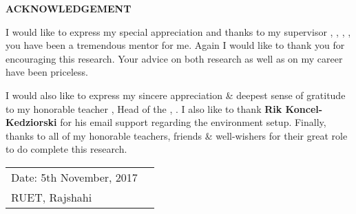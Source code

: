 \documentclass[document.tex]{subfiles}
\begin{document}

\begin{center}
\textbf{{\fontsize{16pt}{0.5cm}\selectfont ACKNOWLEDGEMENT}}
\vspace{1cm}
\end{center}

\noindent I would like to express my special appreciation and thanks to my supervisor \textbf{\thesissupervisor}, \thesissupervisordesignation, \deptT, \ruet, you have been a tremendous mentor for me. Again I would like to thank you for encouraging this research. Your advice on both research as well as on my career have been priceless. 

\noindent I would also like to express my sincere appreciation \& deepest sense of gratitude to my honorable teacher \textbf{\depthead}, Head of the \deptT, \ruet.
\noindent I also like to thank \textbf{Rik Koncel-Kedziorski} for his email support regarding the environment setup.
\noindent Finally, thanks to all of my honorable teachers, friends \& well-wishers for their great role to do complete this research.

\vfill
\noindent 
\begin{tabularx}{\textwidth}{X X}
  {\fontsize{14pt}{0.5cm}\selectfont Date: 5th November, 2017} & \raggedleft { \fontsize{14pt}{0.5cm}\selectfont \authorname }\tabularnewline
{\fontsize{14pt}{0.5cm}\selectfont RUET, Rajshahi} & \tabularnewline
\end{tabularx}



\clearpage
\end{document}
